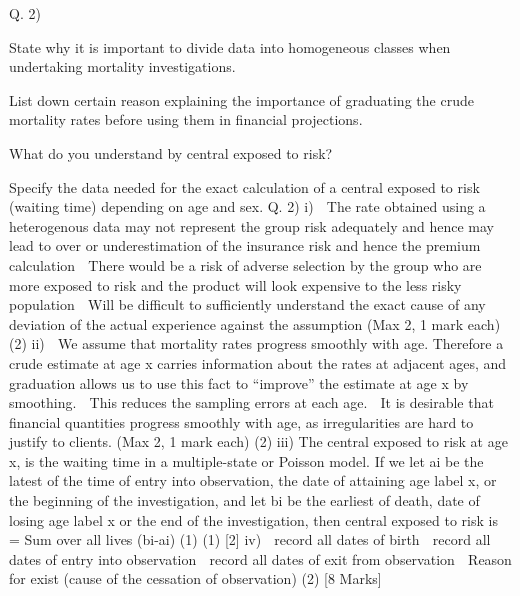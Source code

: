 Q. 2) \item State why it is important to divide data into homogeneous classes when undertaking
mortality investigations. 
\item List down certain reason explaining the importance of graduating the crude mortality
rates before using them in financial projections. 
\item What do you understand by central exposed to risk?

\item Specify the data needed for the exact calculation of a central exposed to risk (waiting
time) depending on age and sex. 
Q. 2)
i)
 The rate obtained using a heterogenous data may not represent the group risk adequately and hence may lead to over or underestimation of the insurance risk and hence the premium calculation
 There would be a risk of adverse selection by the group who are more exposed to risk and the product will look expensive to the less risky population
 Will be difficult to sufficiently understand the exact cause of any deviation of the actual experience against the assumption
(Max 2, 1 mark each)
(2)
ii)
 We assume that mortality rates progress smoothly with age. Therefore a crude estimate at age x carries information about the rates at adjacent ages, and graduation allows us to use this fact to “improve” the estimate at age x by smoothing.
 This reduces the sampling errors at each age.
 It is desirable that financial quantities progress smoothly with age, as irregularities are hard to justify to clients.
(Max 2, 1 mark each)
(2)
iii)
The central exposed to risk at age x, is the waiting time in a multiple-state or Poisson model.
If we let ai be the latest of the time of entry into observation, the date of attaining age label x, or the beginning of the investigation, and let bi be the earliest of death, date of losing age label x or the end of the investigation, then central exposed to risk is = Sum over all lives (bi-ai)
(1)
(1)
[2]
iv)
 record all dates of birth
 record all dates of entry into observation
 record all dates of exit from observation
 Reason for exist (cause of the cessation of observation)
(2)
[8 Marks]
